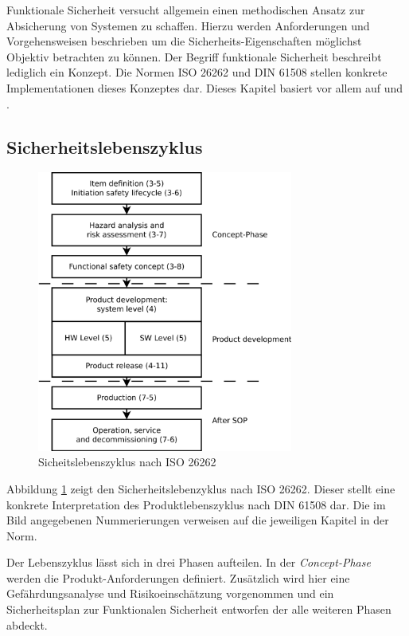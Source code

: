 \documentclass[
  a4paper,					    %
  twoside,
  DIV=calc,     				%
  bibliography=totoc,
  cleardoublepage=empty,
  ngerman,     					%
  final       					%
]{scrbook}
\begin{document}
Funktionale Sicherheit versucht allgemein einen methodischen Ansatz zur Absicherung von Systemen zu schaffen. Hierzu werden Anforderungen und Vorgehensweisen beschrieben um die Sicherheits-Eigenschaften möglichst Objektiv betrachten zu können. Der Begriff funktionale Sicherheit beschreibt lediglich ein Konzept. Die Normen ISO 26262 und DIN 61508 stellen konkrete Implementationen dieses Konzeptes dar. Dieses Kapitel basiert vor allem auf \cite{iso26262} und \cite{iso26262_robuste}.

\subsection{Sicherheitslebenszyklus}
\label{sec:ISO26262_lebenszyklus}

\begin{figure}[H]
\includegraphics[width=0.75\textwidth]{ISO_26262_Lifecycle}
\caption{Sicheitslebenszyklus nach ISO 26262\cite{iso26262}}
\label{fig:lifecycle}
\end{figure}

Abbildung \ref{fig:lifecycle} zeigt den Sicherheitslebenzyklus nach ISO 26262. Dieser stellt eine konkrete Interpretation des Produktlebenszyklus nach DIN 61508 dar. Die im Bild angegebenen Nummerierungen verweisen auf die jeweiligen Kapitel in der Norm. 

Der Lebenszyklus lässt sich in drei Phasen aufteilen. In der \emph{Concept-Phase} werden die Produkt-Anforderungen definiert. Zusätzlich wird hier eine Gefährdungsanalyse und Risikoeinschätzung vorgenommen und ein Sicherheitsplan zur Funktionalen Sicherheit entworfen der alle weiteren Phasen abdeckt.
\end{document}
